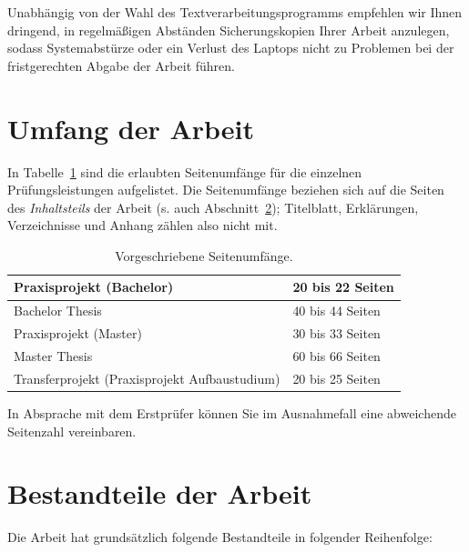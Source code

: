 Unabhängig von der Wahl des Textverarbeitungsprogramms empfehlen wir Ihnen dringend, in regelmäßigen Abständen Sicherungskopien Ihrer Arbeit anzulegen, sodass Systemabstürze oder ein Verlust des Laptops nicht zu Problemen bei der fristgerechten Abgabe der Arbeit führen.

\section{Umfang der Arbeit}

In Tabelle~\ref{tab:seitenumfang} sind die erlaubten Seitenumfänge für die einzelnen Prüfungsleistungen aufgelistet.
Die Seitenumfänge beziehen sich auf die Seiten des \textit{Inhaltsteils} der Arbeit (s. auch Abschnitt~\ref{sec:bestandteile-der-arbeit}); Titelblatt, Erklärungen, Verzeichnisse und Anhang zählen also nicht mit.

\begin{table}[ht]
\centering
\begin{tabular}{|p{8cm}| p{3cm}|}
\hline
     Praxisprojekt (Bachelor) & 20 bis 22 Seiten \\\hline
     Bachelor Thesis & 40 bis 44 Seiten \\\hline
     Praxisprojekt (Master) & 30 bis 33 Seiten \\\hline
     Master Thesis & 60 bis 66 Seiten \\\hline
     Transferprojekt (Praxisprojekt Aufbaustudium) & 20 bis 25 Seiten \\\hline
\end{tabular}
\caption{\label{tab:seitenumfang}Vorgeschriebene Seitenumfänge.}
\end{table}

In Absprache mit dem Erstprüfer können Sie im Ausnahmefall eine abweichende Seitenzahl vereinbaren.


\section{Bestandteile der Arbeit}
\label{sec:bestandteile-der-arbeit}

Die Arbeit hat grundsätzlich folgende Bestandteile in folgender Reihenfolge:

